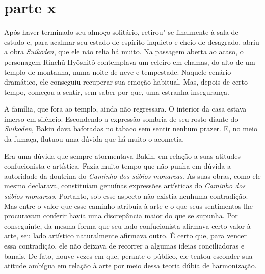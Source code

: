 \section*{parte x}

Após haver terminado seu almoço solitário, retirou"-se finalmente à sala
de estudo e, para acalmar seu estado de espírito inquieto e cheio de
desagrado, abriu a obra \textit{Suikoden}, que ele não relia há muito.
Na passagem aberta ao acaso, o personagem Rinchû Hyôshitô contemplava
um celeiro em chamas, do alto de um templo de montanha, numa noite de
neve e tempestade. Naquele cenário dramático, ele conseguiu recuperar
sua emoção habitual. Mas, depois de certo tempo, começou a sentir, sem
saber por que, uma estranha insegurança.

A família, que fora ao templo, ainda não regressara. O interior da casa
estava imerso em silêncio. Escondendo a expressão sombria de seu rosto
diante do \textit{Suikoden}, Bakin dava baforadas no tabaco sem sentir
nenhum prazer. E, no meio da fumaça, flutuou uma dúvida que há muito o
acometia.

Era uma dúvida que sempre atormentava Bakin, em relação a suas atitudes
confucionista e artística. Fazia muito tempo que não punha em dúvida a
autoridade da doutrina do \textit{Caminho dos sábios monarcas}. As suas obras,
como ele mesmo declarava, constituíam genuínas expressões artísticas do
\textit{Caminho dos sábios monarcas}. Portanto, sob esse aspecto não existia
nenhuma contradição. Mas entre o valor que esse caminho atribuía à arte
e o que seus sentimentos lhe procuravam conferir havia uma discrepância
maior do que se supunha. Por conseguinte, da mesma forma que seu lado
confucionista afirmava certo valor à arte, seu lado artístico
naturalmente afirmava outro. É certo que, para vencer essa contradição,
ele não deixava de recorrer a algumas ideias conciliadoras e banais. De
fato, houve vezes em que, perante o público, ele tentou esconder sua
atitude ambígua em relação à arte por meio dessa teoria dúbia de harmonização.

